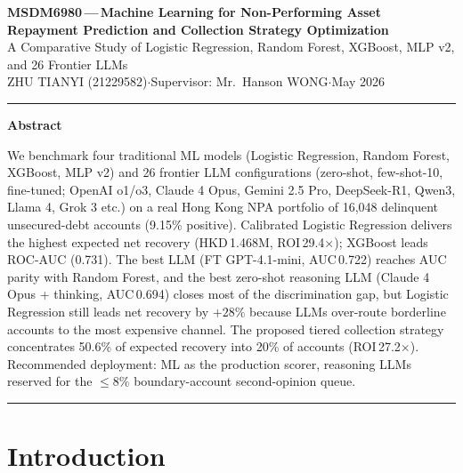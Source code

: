 \documentclass[11pt, a4paper]{article}
\begin{document}
\begin{center}
{\LARGE\bfseries MSDM6980\,---\,Machine Learning for Non-Performing Asset\\[2pt]
Repayment Prediction and Collection Strategy Optimization}\\[6pt]
{\normalsize A Comparative Study of Logistic Regression, Random Forest, XGBoost, MLP v2, and 26 Frontier LLMs}\\[6pt]
{\small ZHU TIANYI (21229582)\quad$\cdot$\quad Supervisor: Mr.\ Hanson WONG\quad$\cdot$\quad May 2026}
\end{center}

\vspace{-4pt}
\hrule
\vspace{4pt}

\begin{center}\textbf{Abstract}\end{center}
\vspace{-6pt}
\small
We benchmark four traditional ML models (Logistic Regression, Random Forest, XGBoost, MLP v2) and 26 frontier LLM configurations (zero-shot, few-shot-10, fine-tuned; OpenAI o1/o3, Claude 4 Opus, Gemini 2.5 Pro, DeepSeek-R1, Qwen3, Llama 4, Grok 3 etc.) on a real Hong Kong NPA portfolio of 16{,}048 delinquent unsecured-debt accounts (9.15\% positive). Calibrated Logistic Regression delivers the highest expected net recovery (HKD\,1.468M, ROI\,29.4$\times$); XGBoost leads ROC-AUC (0.731). The best LLM (FT GPT-4.1-mini, AUC\,0.722) reaches AUC parity with Random Forest, and the best zero-shot reasoning LLM (Claude 4 Opus + thinking, AUC\,0.694) closes most of the discrimination gap, but Logistic Regression still leads net recovery by $+28\%$ because LLMs over-route borderline accounts to the most expensive channel. The proposed tiered collection strategy concentrates 50.6\% of expected recovery into 20\% of accounts (ROI\,27.2$\times$). Recommended deployment: ML as the production scorer, reasoning LLMs reserved for the $\le 8\%$ boundary-account second-opinion queue.
\normalsize
\vspace{2pt}
\hrule
\vspace{6pt}

\section{Introduction}\label{sec:intro}
\end{document}

